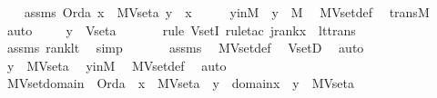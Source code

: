 \begin{isabellebody}
\ \ \isamarkupfalse%
\ assms{\isacharcolon}{\kern0pt}\ {\isachardoublequoteopen}Ord{\isacharparenleft}{\kern0pt}a{\isacharparenright}{\kern0pt}{\isachardoublequoteclose}\ {\isachardoublequoteopen}x\ {\isasymin}\ MVset{\isacharparenleft}{\kern0pt}a{\isacharparenright}{\kern0pt}{\isachardoublequoteclose}\ {\isachardoublequoteopen}y\ {\isasymin}\ x{\isachardoublequoteclose}\isanewline
\ \ \isamarkupfalse%
\ \isamarkupfalse%
\ yinM\ {\isacharcolon}{\kern0pt}\ {\isachardoublequoteopen}y\ {\isasymin}\ M{\isachardoublequoteclose}\ \isamarkupfalse%
\ MVset{\isacharunderscore}{\kern0pt}def\ \isamarkupfalse%
\ transM\ \isamarkupfalse%
\ auto\ \isanewline
\ \ \isamarkupfalse%
\ {\isachardoublequoteopen}y\ {\isasymin}\ Vset{\isacharparenleft}{\kern0pt}a{\isacharparenright}{\kern0pt}{\isachardoublequoteclose}\ \isanewline
\ \ \ \ \isamarkupfalse%
\ {\isacharparenleft}{\kern0pt}rule\ VsetI{\isacharsemicolon}{\kern0pt}\ rule{\isacharunderscore}{\kern0pt}tac\ j{\isacharequal}{\kern0pt}{\isachardoublequoteopen}rank{\isacharparenleft}{\kern0pt}x{\isacharparenright}{\kern0pt}{\isachardoublequoteclose}\ \ lt{\isacharunderscore}{\kern0pt}trans{\isacharparenright}{\kern0pt}\ \isanewline
\ \ \ \ \isamarkupfalse%
\ assms\ rank{\isacharunderscore}{\kern0pt}lt\ \isamarkupfalse%
\ simp\ \isanewline
\ \ \ \ \isamarkupfalse%
\ assms\ \isamarkupfalse%
\ MVset{\isacharunderscore}{\kern0pt}def\ \isamarkupfalse%
\ VsetD\ \isamarkupfalse%
\ auto\isanewline
\ \ \isamarkupfalse%
\ \isamarkupfalse%
\ {\isachardoublequoteopen}y\ {\isasymin}\ MVset{\isacharparenleft}{\kern0pt}a{\isacharparenright}{\kern0pt}{\isachardoublequoteclose}\ \isamarkupfalse%
\ yinM\ \isamarkupfalse%
\ MVset{\isacharunderscore}{\kern0pt}def\ \isamarkupfalse%
\ auto\ \isanewline
{}\isamarkupfalse%
%
\endisatagproof
{\isafoldproof}%
%
\isadelimproof
\isanewline
%
\endisadelimproof
\isanewline
{}\isamarkupfalse%
\ MVset{\isacharunderscore}{\kern0pt}domain\ {\isacharcolon}{\kern0pt}\ {\isachardoublequoteopen}Ord{\isacharparenleft}{\kern0pt}a{\isacharparenright}{\kern0pt}\ {\isasymLongrightarrow}\ x\ {\isasymin}\ MVset{\isacharparenleft}{\kern0pt}a{\isacharparenright}{\kern0pt}\ {\isasymLongrightarrow}\ y\ {\isasymin}\ domain{\isacharparenleft}{\kern0pt}x{\isacharparenright}{\kern0pt}\ {\isasymLongrightarrow}\ y\ {\isasymin}\ MVset{\isacharparenleft}{\kern0pt}a{\isacharparenright}{\kern0pt}{\isachardoublequoteclose}\ \isanewline

\end{isabellebody}
